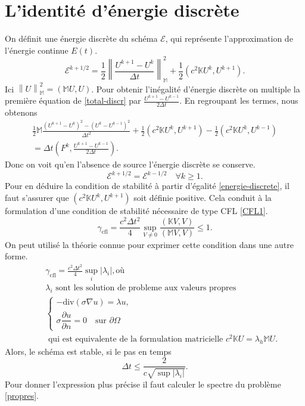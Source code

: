 \documentclass[12pt]{article}
\newcommand\norm[1]{\left\lVert#1\right\rVert}
\newcommand{\pd}[2]{ %
	\dfrac{\partial #1}{\partial #2}
}
\begin{document}
\section{L'identité d'énergie discrète}
On définit une énergie discrète du schéma $\mathcal{E}$, qui représente l'approximation de l'énergie continue $E(t)$.
\begin{equation*}
	\mathcal{E}^{k + 1/2} = \frac{1}{2}\norm{\frac{U^{k+1} - U^k}{\Delta t}}_\mathbb{M}^2 + \frac{1}{2}(c^2\mathbb{K}U^k, U^{k+1}).
\end{equation*}
Ici $\norm{U}_\mathbb{M}^2 = (\mathbb{M}U,U)$. Pour obtenir l'inégalité d'énergie discrète on multiple la première équation de \eqref{total-discr} par $\frac{U^{k+1} - U^{k - 1}}{2\Delta t}$. En regroupant les termes, nous obtenons
\begin{multline*}
	\frac{1}{2}\mathbb{M}\frac{(U^{k+1} - U^k)^2 - (U^k - U^{k-1})^2}{\Delta t^2} + \frac{1}{2}(c^2\mathbb{K}U^k, U^{k+1}) - \frac{1}{2}(c^2\mathbb{K}U^{k}, U^{k-1}) \\= \Delta t(F^k, \frac{U^{k+1} - U^{k - 1}}{2\Delta t}).
\end{multline*}
Donc on voit qu'en l'absence de source l'énergie discrète se conserve.
\begin{equation}
\label{energie-discrete}
	\mathcal{E}^{k +1/2} = \mathcal{E}^{k - 1/2} \quad \forall k \geq 1.
\end{equation}
Pour en déduire la condition de stabilité à partir d'égalité \eqref{energie-discrete}, il faut s'assurer que $(c^2\mathbb{K}U^k, U^{k+1})$ soit définie positive. Cela conduit à la formulation d'une condition de stabilité nécessaire de type CFL \eqref{CFL1}.
\begin{equation}
\label{CFL1}
\gamma_{\text{cfl}} = \frac{c^2 \Delta t^2}{4}\sup_{V \neq 0} \frac{(\mathbb{K}V, V)}{(\mathbb{M}V, V)} \leq 1.
\end{equation}
On peut utilisé la théorie connue pour exprimer cette condition dans une autre forme.
\begin{eqnarray}\nonumber
	& &\gamma_{\text{cfl}} = \frac{c^2 \Delta t^2}{4} \sup_i|\lambda_i|, \text{où}\\
	\nonumber
	& &\lambda_i \text{ sont les solution de probleme aux valeurs propres}\\
	\label{propres}
	& &\begin{cases}
	-\text{div}(\sigma\nabla u ) = \lambda u,\\
	\sigma \pd{u}{n} = 0 \quad \text{sur } \partial\Omega
	\end{cases} \\
		\nonumber
	& &\text{ qui est equivalente de la formulation matricielle } c^2\mathbb{K}U = \lambda_h \mathbb{M}U.
\end{eqnarray}
Alors, le schéma est stable, si le pas en temps 
\begin{equation}
\label{CFL}
\Delta t \leq \frac{2}{c \sqrt{\sup |\lambda_i|}}.
\end{equation}
Pour donner l'expression plus précise il faut calculer le spectre du problème \eqref{propres}.
\end{document}
